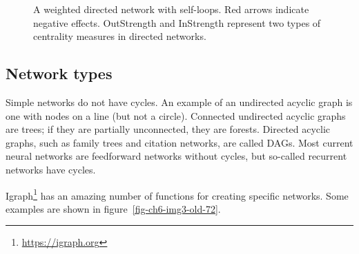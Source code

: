 \documentclass[
  a4paper,
  DIV=11,
  numbers=noendperiod,
  oneside]{scrreprt}
\begin{document}
\begin{figure}


\caption{\label{fig-ch6-img2-old-71}A weighted directed network with
self-loops. Red arrows indicate negative effects. OutStrength and
InStrength represent two types of centrality measures in directed
networks.}

\end{figure}%

\subsection{Network types}\label{sec-Network-types}

Simple networks do not have cycles. An example of an undirected acyclic
graph is one with nodes on a line (but not a circle). Connected
undirected acyclic graphs are trees; if they are partially unconnected,
they are forests. Directed acyclic graphs, such as family trees and
citation networks, are called DAGs. Most current neural networks are
feedforward networks without cycles, but so-called recurrent networks
have cycles.

Igraph\footnote{\url{https://igraph.org}} has an amazing number of
functions for creating specific networks. Some examples are shown in
figure~\ref{fig-ch6-img3-old-72}.
\end{document}
